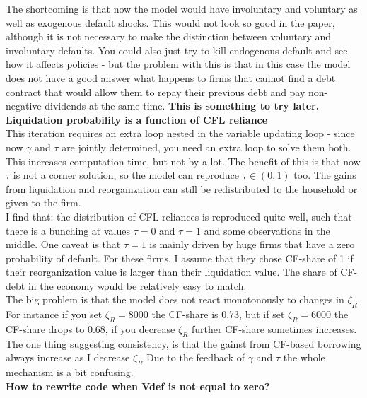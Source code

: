 \documentclass[12pt]{article}
\begin{document}
The shortcoming is that now the model would have involuntary and voluntary as well as exogenous default shocks. This would not look so good in the paper, although it is not necessary to make the distinction between voluntary and involuntary defaults. You could also just try to kill endogenous default and see how it affects policies - but the problem with this is that in this case the model does not have a good answer what happens to firms that cannot find a debt contract that would allow them to repay their previous debt and pay non-negative dividends at the same time. \textbf{This is something to try later.} \vspace{3mm} \\
\textbf{Liquidation probability is a function of CFL reliance} \\
This iteration requires an extra loop nested in the variable updating loop - since now $\gamma$ and $\tau$ are jointly determined, you need an extra loop to solve them both. This increases computation time, but not by a lot. The benefit of this is that now $\tau$ is not a corner solution, so the model can reproduce $\tau \in (0,1)$ too. The gains from liquidation and reorganization can still be redistributed to the household or given to the firm. \vspace{3mm} \\
I find that: the distribution of CFL reliances is reproduced quite well, such that there is a bunching at values $\tau = 0$ and $\tau = 1$ and some observations in the middle. One caveat is that $\tau = 1$ is mainly driven by huge firms that have a zero probability of default. For these firms, I assume that they chose CF-share of 1 if their reorganization value is larger than their liquidation value. The share of CF-debt in the economy would be relatively easy to match.   \vspace{3mm} \\
The big problem is that the model does not react monotonously to changes in $\zeta_R$. For instance if you set $\zeta_R = 8000$ the CF-share is 0.73, but if set $\zeta_R = 6000$ the CF-share drops to 0.68, if you decrease $\zeta_R$ further CF-share sometimes increases. The one thing suggesting consistency, is that the gainst from CF-based borrowing always increase as I decrease $\zeta_R$ Due to the feedback of $\gamma$ and $\tau$ the whole mechanism is a bit confusing. \vspace{3mm} \\
\textbf{How to rewrite code when Vdef is not equal to zero?} \\
\end{document}
